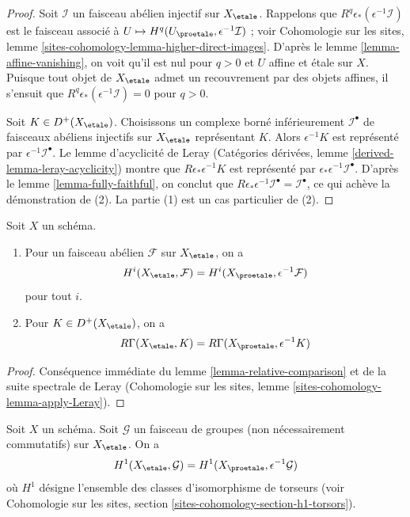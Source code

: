 \begin{proof}
Soit $\mathcal{I}$ un faisceau abélien injectif sur $X_\etale$.
Rappelons que $R^q\epsilon_*(\epsilon^{-1}\mathcal{I})$ est le faisceau associé
à $U \mapsto H^q(U_\proetale, \epsilon^{-1}\mathcal{I})$ ; voir
Cohomologie sur les sites, lemme \ref{sites-cohomology-lemma-higher-direct-images}.
D'après le lemme \ref{lemma-affine-vanishing}, on voit qu'il est nul pour $q > 0$
et $U$ affine et \'etale sur $X$. Puisque tout objet de
$X_\etale$ admet un recouvrement par des objets affines, il s'ensuit que
$R^q\epsilon_*(\epsilon^{-1}\mathcal{I}) = 0$ pour $q > 0$.

\medskip\noindent
Soit $K \in D^+(X_\etale)$. Choisissons un complexe borné inférieurement $\mathcal{I}^\bullet$
de faisceaux abéliens injectifs sur $X_\etale$ représentant $K$.
Alors $\epsilon^{-1}K$ est représenté par $\epsilon^{-1}\mathcal{I}^\bullet$.
Le lemme d'acyclicité de Leray (Catégories dérivées, lemme
\ref{derived-lemma-leray-acyclicity}) montre que $R\epsilon_*\epsilon^{-1}K$
est représenté par $\epsilon_*\epsilon^{-1}\mathcal{I}^\bullet$.
D'après le lemme \ref{lemma-fully-faithful}, on conclut que
$R\epsilon_*\epsilon^{-1}\mathcal{I}^\bullet = \mathcal{I}^\bullet$,
ce qui achève la démonstration de (2). La partie (1) est un cas particulier de (2).
\end{proof}

\begin{lemma}
\label{lemma-compare-cohomology}
Soit $X$ un schéma.
\begin{enumerate}
\item Pour un faisceau abélien $\mathcal{F}$ sur $X_\etale$, on a
$$
H^i(X_\etale, \mathcal{F}) =
H^i(X_\proetale, \epsilon^{-1}\mathcal{F})
$$
pour tout $i$.
\item Pour $K \in D^+(X_\etale)$, on a
$$
R\Gamma(X_\etale, K) = R\Gamma(X_\proetale, \epsilon^{-1}K)
$$
\end{enumerate}
\end{lemma}

\begin{proof}
Conséquence immédiate du lemme \ref{lemma-relative-comparison} et de
la suite spectrale de Leray (Cohomologie sur les sites, lemme
\ref{sites-cohomology-lemma-apply-Leray}).
\end{proof}

\begin{lemma}
\label{lemma-compare-cohomology-nonabelian}
Soit $X$ un schéma. Soit $\mathcal{G}$ un faisceau de groupes (non nécessairement
commutatifs) sur $X_\etale$. On a
$$
H^1(X_\etale, \mathcal{G}) =
H^1(X_\proetale, \epsilon^{-1}\mathcal{G})
$$
où $H^1$ désigne l'ensemble des classes d'isomorphisme de
torseurs (voir
Cohomologie sur les sites, section \ref{sites-cohomology-section-h1-torsors}).
\end{lemma}

